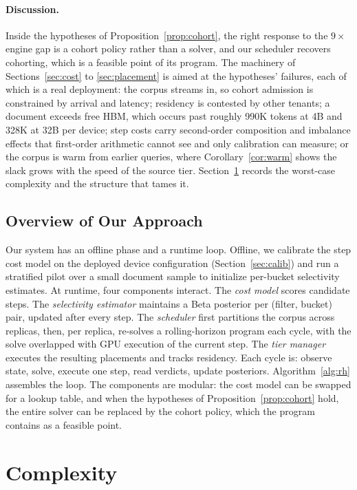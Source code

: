\documentclass[10pt,twocolumn]{article}
\begin{document}
\paragraph{Discussion.} Inside the hypotheses of Proposition~\ref{prop:cohort}, the right response to the $9\times$ engine gap is a cohort policy rather than a solver, and our scheduler recovers cohorting, which is a feasible point of its program. The machinery of Sections~\ref{sec:cost} to \ref{sec:placement} is aimed at the hypotheses' failures, each of which is a real deployment: the corpus streams in, so cohort admission is constrained by arrival and latency; residency is contested by other tenants; a document exceeds free HBM, which occurs past roughly 990K tokens at 4B and 328K at 32B per device; step costs carry second-order composition and imbalance effects that first-order arithmetic cannot see and only calibration can measure; or the corpus is warm from earlier queries, where Corollary~\ref{cor:warm} shows the slack grows with the speed of the source tier. Section~\ref{sec:hardness} records the worst-case complexity and the structure that tames it.

\subsection{Overview of Our Approach}
\label{sec:overview}

Our system has an offline phase and a runtime loop. Offline, we calibrate the step cost model on the deployed device configuration (Section~\ref{sec:calib}) and run a stratified pilot over a small document sample to initialize per-bucket selectivity estimates. At runtime, four components interact. The \emph{cost model} scores candidate steps. The \emph{selectivity estimator} maintains a Beta posterior per (filter, bucket) pair, updated after every step. The \emph{scheduler} first partitions the corpus across replicas, then, per replica, re-solves a rolling-horizon program each cycle, with the solve overlapped with GPU execution of the current step. The \emph{tier manager} executes the resulting placements and tracks residency. Each cycle is: observe state, solve, execute one step, read verdicts, update posteriors. Algorithm~\ref{alg:rh} assembles the loop. The components are modular: the cost model can be swapped for a lookup table, and when the hypotheses of Proposition~\ref{prop:cohort} hold, the entire solver can be replaced by the cohort policy, which the program contains as a feasible point.

\section{Complexity}
\label{sec:hardness}
\end{document}
